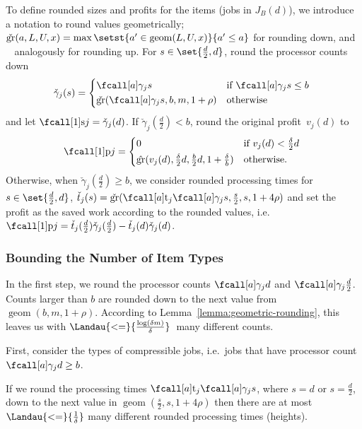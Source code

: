 To define rounded sizes and profits for the items (jobs in $J_B(d)$),
we introduce a notation to round values geometrically;
$\mathop{\mathrm{\check{gr}}}(a, L, U, x) = \max \setst{a' \in \mathop{\mathrm{geom}}(L, U, x)}{a' \leq a}$
for rounding down, and $\mathop{\mathrm{\hat{gr}}}$ analogously for rounding up.
For $s \in \set{\frac{d}{2}, d}$, round the processor counts down
\begin{equation}
  \check{\gamma}_j(s) =
    \begin{cases*}
      \procnum{j}{s} & if $\procnum{j}{s} \leq b$ \\
      \mathop{\mathrm{\check{gr}}}(\procnum{j}{s}, b, m, 1 + \rho) & otherwise
    \end{cases*}
\end{equation}
and let $\s{j} = \check{\gamma}_j(d)$.
If $\check{\gamma}_j(\frac{d}{2}) < b$, round the original profit~$v_j(d)$ to
\begin{equation}
  \pr{j} =
    \begin{cases*}
      0 & if $v_j(d) < \frac{\delta}{2}d$ \\
      \mathop{\mathrm{\hat{gr}}}(v_j(d), \frac{\delta}{2}d, \frac{b}{2}d, 1 + \frac{\delta}{b}) & otherwise.
    \end{cases*}
\end{equation}
Otherwise, when $\check{\gamma}_j(\frac{d}{2}) \geq b$,
we consider rounded processing times for $s \in \set{\frac{d}{2}, d}$,
$\check{t}_j(s) = \mathop{\mathrm{\check{gr}}}(\ptm{j}{\procnum{j}{s}}, \frac{s}{2}, s, 1 + 4\rho)$
and set the profit as the saved work according to the rounded values,
i.e.~$\pr{j} = \check{t}_j(\frac{d}{2}) \check{\gamma}_j(\frac{d}{2}) - \check{t}_j(d) \check{\gamma}_j(d)$.


\subsubsection{Bounding the Number of Item Types}

In the first step, we round the processor counts $\procnum{j}{d}$ and $\procnum{j}{\frac{d}{2}}$.
Counts larger than $b$ are rounded down to the next value from $\mathop{\mathrm{geom}}(b, m, 1 + \rho)$.
According to Lemma~\ref{lemma:geometric-rounding},
this leaves us with $\Landau{<=}{\frac{\log (\delta m)}{\delta}}$~many different counts.

First, consider the types of compressible jobs,
i.e.~jobs that have processor count~$\procnum{j}{d} \geq b$.
\begin{lemma}
  \label{lemma:heights-bound}
  If we round the processing times $\ptm{j}{\procnum{j}{s}}$, where $s = d$ or $s = \frac{d}{2}$,
  down to the next value in $\mathop{\mathrm{geom}}(\frac{s}{2}, s, 1 + 4\rho)$  
  then there are at most $\Landau{<=}{\frac{1}{\delta}}$ many different rounded processing times (heights).
\end{lemma}

